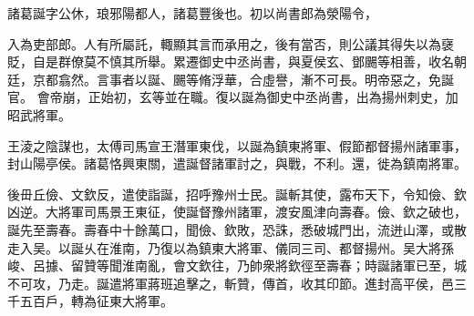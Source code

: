 \begin{pinyinscope}
 
 
 諸葛誕字公休，琅邪陽都人，諸葛豐後也。初以尚書郎為滎陽令，
 
 
 入為吏部郎。人有所屬託，輙顯其言而承用之，後有當否，則公議其得失以為襃貶，自是群僚莫不慎其所舉。累遷御史中丞尚書，與夏侯玄、鄧颺等相善，收名朝廷，京都翕然。言事者以誕、颺等脩浮華，合虛譽，漸不可長。明帝惡之，免誕官。
 會帝崩，正始初，玄等並在職。復以誕為御史中丞尚書，出為揚州刺史，加昭武將軍。
 
 
 
 
 王淩之陰謀也，太傅司馬宣王潛軍東伐，以誕為鎮東將軍、假節都督揚州諸軍事，封山陽亭侯。諸葛恪興東關，遣誕督諸軍討之，與戰，不利。還，徙為鎮南將軍。
 
 
 
 
 後毌丘儉、文欽反，遣使詣誕，招呼豫州士民。誕斬其使，露布天下，令知儉、欽凶逆。大將軍司馬景王東征，使誕督豫州諸軍，渡安風津向壽春。儉、欽之破也，誕先至壽春。壽春中十餘萬口，聞儉、欽敗，恐誅，悉破城門出，流迸山澤，或散走入吴。以誕乆在淮南，乃復以為鎮東大將軍、儀同三司、都督揚州。吴大將孫峻、呂據、留贊等聞淮南亂，會文欽往，乃帥衆將欽徑至壽春；時誕諸軍已至，城不可攻，乃走。誕遣將軍蔣班追擊之，斬贊，傳首，收其印節。進封高平侯，邑三千五百戶，轉為征東大將軍。
 

\end{pinyinscope}
